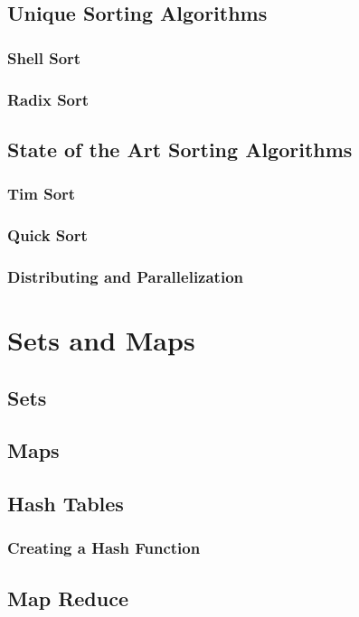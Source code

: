\documentclass[10pt,a4paper]{book}
\begin{document}
\section{Unique Sorting Algorithms}


\subsection{Shell Sort}

\subsection{Radix Sort}

\section{State of the Art Sorting Algorithms}

\subsection{Tim Sort}
\subsection{Quick Sort}
\subsection{Distributing and Parallelization}


\chapter{Sets and Maps}
\section{Sets}
\section{Maps}
\section{Hash Tables}
\subsection{Creating a Hash Function}
\section{Map Reduce}
\end{document}
